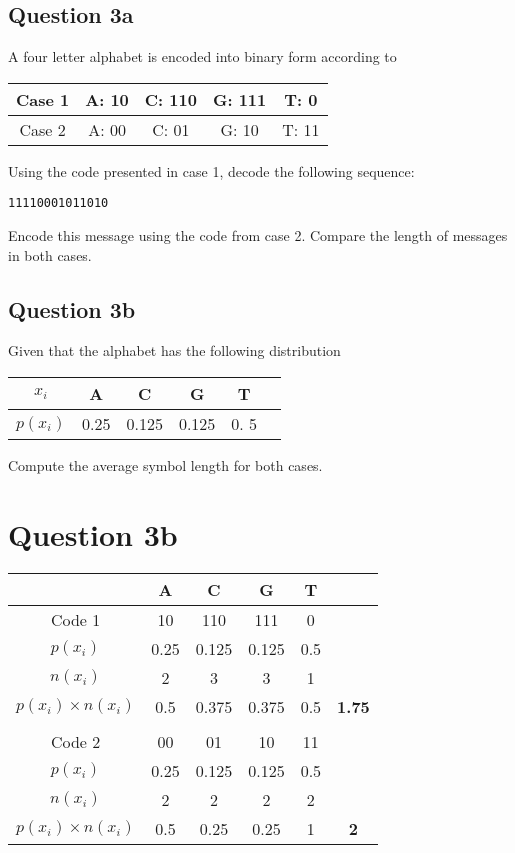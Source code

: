 
\newpage 
\subsection*{Question 3a}
A four letter alphabet is encoded into binary form according to
\begin{center}
\begin{tabular}{|c|c|c|c|c|}
\hline Case 1	&	A:  10 	&	C:  110	&	G:  111 &	T:  0  \\ \hline
Case 2	&	A:  00	&	C:  01	&		G: 10	&	T: 11	\\ \hline
\end{tabular} 
\end{center}
Using the code presented in case 1, decode the following sequence:
\begin{verbatim}	
11110001011010
\end{verbatim}

\noindent Encode this message using the code from case 2. Compare the length of messages in both cases.

\subsection*{Question 3b}
Given that the alphabet has the following distribution 
\begin{center}
\begin{tabular}{|c|c|c|c|c|c|}
\hline
$x_i$	& A	& C	& G	& T \\ \hline
$p(x_i)$	& 0.25	& 0.125	& 0.125	& 0. 5 \\ \hline
\end{tabular} 
\end{center}
Compute the average symbol length for both cases.



\section*{Question 3b}
\begin{center}
\begin{tabular}{|c|c|c|c|c|c|}
\hline 
	&	A	&	C	&	G	&	T	&		\\ \hline	
Code 1	&	10	&	110	&	111	&	0	&		\\ \hline	
$p(x_i)$	&	0.25	&	0.125	&	0.125	&	0.5	&		\\ \hline	
$n(x_i)$	&	2	&	3	&	3	&	1	&		\\ \hline	
$p(x_i) \times n(x_i)$	&	0.5	&	0.375	&	0.375	&	0.5	&	\textbf{1.75}	\\ \hline	
	&		&		&		&		&		\\ \hline	\hline
Code 2	&	00	&	01	&	10	&	11	&		\\ \hline	
$p(x_i)$	&	0.25	&	0.125	&	0.125	&	0.5	&		\\ \hline	
$n(x_i)$	&	2	&	2	&	2	&	2	&		\\ \hline	
$p(x_i) \times n(x_i)$	&	0.5	&	0.25	&	0.25	&	1	&	\textbf{2}	\\ \hline	
\end{tabular} 
\end{center}

